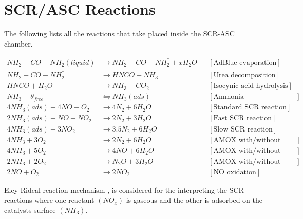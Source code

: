 \section{SCR/ASC Reactions}
The following lists all the reactions that take placed inside the SCR-ASC chamber.

\begin{align*}
    NH_2 - CO - NH_2 (liquid) &\longrightarrow NH_2 - CO - NH_2^* + x H_2 O
                & &[\text{AdBlue evaporation}] \\
    NH_2 - CO - NH_2^*  &\longrightarrow  HNCO + NH_3
                & &[\text{Urea decomposition}] \\
    HNCO + H_2O &\longrightarrow NH_3 + CO_2
                & &[\text{Isocynic acid hydrolysis}] \\
    NH_3 + \theta_{free} &\leftrightharpoons NH_3(ads)
                         & &[\text{Ammonia Adsorption/Desorption}]\\
    4 NH_3 (ads) + 4 NO + O_2 &\longrightarrow 4 N_2 + 6 H_2O
                              & &[\text{Standard SCR reaction}]\\
    2 NH_3 (ads) +  NO + N O_2 &\longrightarrow 2 N_2 + 3 H_2O
                              & &[\text{Fast SCR reaction}]\\
    4 NH_3 (ads) + 3N O_2 &\longrightarrow 3.5 N_2 + 6 H_2O
                              & &[\text{Slow SCR reaction}]\\
    4 NH_3 + 3 O_2 &\longrightarrow 2 N_2 + 6 H_2O
                         & &[\text{AMOX with/without ASC}]\\
    4 NH_3 + 5 O_2 &\longrightarrow 4 NO + 6 H_2 O
                         & &[\text{AMOX with/without ASC}]\\
    2 NH_3 + 2 O_2 &\longrightarrow N_2O + 3 H_2O
                         & &[\text{AMOX with/without ASC}]\\
    2 NO + O_2 &\longrightarrow 2 NO_2
                        & &[\text{NO oxidation}]
\end{align*}

Eley-Rideal reaction mechanism \cite{hsieh2011development}
\cite{yuan2015diesel}, \cite{nova2014urea} is considered for the interpreting
the SCR reactions where one reactant $(NO_x)$ is gaseous and the other is
adsorbed on the catalysts surface $(NH_3)$.

